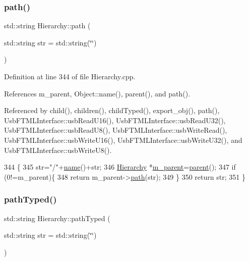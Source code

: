 \subsubsection{\texorpdfstring{path()}{path()}}
{\footnotesize\ttfamily std\+::string Hierarchy\+::path (\begin{DoxyParamCaption}\item[{std\+::string}]{str = {\ttfamily std\+:\+:string(\char`\"{}\char`\"{})} }\end{DoxyParamCaption})}



Definition at line 344 of file Hierarchy.\+cpp.



References m\+\_\+parent, Object\+::name(), parent(), and path().



Referenced by child(), children(), child\+Typed(), export\+\_\+obj(), path(), Usb\+F\+T\+M\+L\+Interface\+::usb\+Read\+U16(), Usb\+F\+T\+M\+L\+Interface\+::usb\+Read\+U32(), Usb\+F\+T\+M\+L\+Interface\+::usb\+Read\+U8(), Usb\+F\+T\+M\+L\+Interface\+::usb\+Write\+Read(), Usb\+F\+T\+M\+L\+Interface\+::usb\+Write\+U16(), Usb\+F\+T\+M\+L\+Interface\+::usb\+Write\+U32(), and Usb\+F\+T\+M\+L\+Interface\+::usb\+Write\+U8().


\begin{DoxyCode}
344                                       \{
345   str=\textcolor{stringliteral}{"/"}+\hyperlink{classObject_a300f4c05dd468c7bb8b3c968868443c1}{name}()+str;
346   \hyperlink{classHierarchy}{Hierarchy} *\hyperlink{classHierarchy_a5814bb280d4e8539ab25ab6cbfb9cc4f}{m\_parent}=\hyperlink{classHierarchy_a1c7bec8257e717f9c1465e06ebf845fc}{parent}();
347   \textcolor{keywordflow}{if} (0!=m\_parent)\{
348     \textcolor{keywordflow}{return} m\_parent->\hyperlink{classHierarchy_aa7990fa7caf132d83e361ce033c6c65a}{path}(str);
349   \}
350   \textcolor{keywordflow}{return} str;
351 \}
\end{DoxyCode}
\mbox{\label{classHierarchy_a1efd56cd164d328d2002e53a10a19b8c}} 
\subsubsection{\texorpdfstring{path\+Typed()}{pathTyped()}}
{\footnotesize\ttfamily std\+::string Hierarchy\+::path\+Typed (\begin{DoxyParamCaption}\item[{std\+::string}]{str = {\ttfamily std\+:\+:string(\char`\"{}\char`\"{})} }\end{DoxyParamCaption})}



